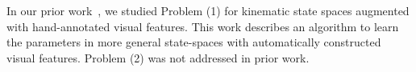 \documentclass[0-main.tex]{subfiles}
\begin{document}
In our prior work~\cite{krishnan2015tsc}, we studied Problem (1) for kinematic state spaces augmented with hand-annotated visual features. This work describes an algorithm to learn the parameters in more general state-spaces with automatically constructed visual features. Problem (2) was not addressed in prior work.
\end{document}
